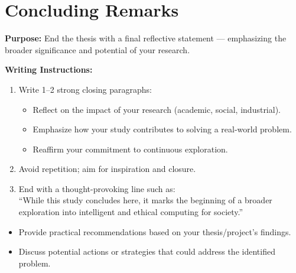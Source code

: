 \section{Concluding Remarks}

{\color{blue}\textbf{Purpose:}
End the thesis with a final reflective statement — emphasizing the broader significance and potential of your research.} \\

{\color{red}\textbf{Writing Instructions:}
\begin{enumerate}
    \item Write 1–2 strong closing paragraphs:
    \begin{itemize}
        \item Reflect on the impact of your research (academic, social, industrial).
        \item Emphasize how your study contributes to solving a real-world problem.
        \item Reaffirm your commitment to continuous exploration.
    \end{itemize}
    
    \item Avoid repetition; aim for inspiration and closure.
    
    \item End with a thought-provoking line such as:\\
    ``While this study concludes here, it marks the beginning of a broader exploration into intelligent and ethical computing for society.''
\end{enumerate}


\begin{itemize}
    \item Provide practical recommendations based on your thesis/project's findings.
    \item Discuss potential actions or strategies that could address the identified problem.
\end{itemize}}
